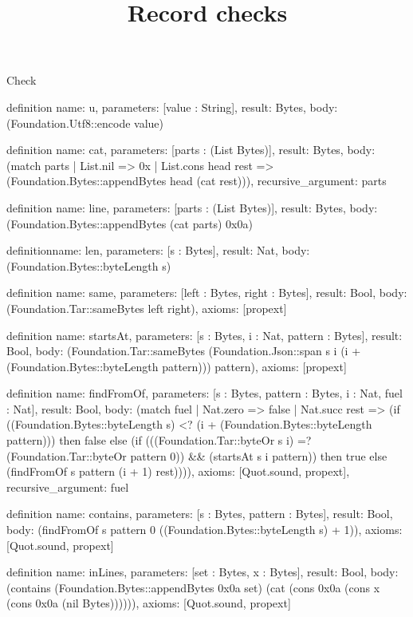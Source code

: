 \begin{lexlean}{Check}
\title{Record checks}
\begin{semanticmodule}
definition{
  name: u,
  parameters: [value : String],
  result: Bytes,
  body: (Foundation.Utf8::encode value)
}

definition{
  name: cat,
  parameters: [parts : (List Bytes)],
  result: Bytes,
  body: (match parts
    | List.nil => 0x
    | List.cons head rest => (Foundation.Bytes::appendBytes head (cat rest))),
  recursive_argument: parts
}

definition{
  name: line,
  parameters: [parts : (List Bytes)],
  result: Bytes,
  body: (Foundation.Bytes::appendBytes (cat parts) 0x0a)
}

definition{name: len, parameters: [s : Bytes], result: Nat, body: (Foundation.Bytes::byteLength s)}

definition{
  name: same,
  parameters: [left : Bytes, right : Bytes],
  result: Bool,
  body: (Foundation.Tar::sameBytes left right),
  axioms: [propext]
}

definition{
  name: startsAt,
  parameters: [s : Bytes, i : Nat, pattern : Bytes],
  result: Bool,
  body: (Foundation.Tar::sameBytes (Foundation.Json::span s i (i + (Foundation.Bytes::byteLength pattern))) pattern),
  axioms: [propext]
}

definition{
  name: findFromOf,
  parameters: [s : Bytes, pattern : Bytes, i : Nat, fuel : Nat],
  result: Bool,
  body: (match fuel
    | Nat.zero => false
    | Nat.succ rest => (if ((Foundation.Bytes::byteLength s) <? (i + (Foundation.Bytes::byteLength pattern))) then false else (if (((Foundation.Tar::byteOr s i) =? (Foundation.Tar::byteOr pattern 0)) && (startsAt s i pattern)) then true else (findFromOf s pattern (i + 1) rest)))),
  axioms: [Quot.sound, propext],
  recursive_argument: fuel
}

definition{
  name: contains,
  parameters: [s : Bytes, pattern : Bytes],
  result: Bool,
  body: (findFromOf s pattern 0 ((Foundation.Bytes::byteLength s) + 1)),
  axioms: [Quot.sound, propext]
}

definition{
  name: inLines,
  parameters: [set : Bytes, x : Bytes],
  result: Bool,
  body: (contains (Foundation.Bytes::appendBytes 0x0a set) (cat (cons 0x0a (cons x (cons 0x0a (nil Bytes)))))),
  axioms: [Quot.sound, propext]
}


\end{semanticmodule}
\end{lexlean}
